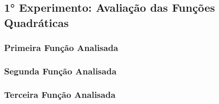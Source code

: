 
\tbltempo
{}\tbliter
{}\tblEFobj
{}\tblESOL


\subsection{1° Experimento: Avaliação das Funções Quadráticas}
    \subsubsection{Primeira Função Analisada}
    \subsubsection{Segunda Função Analisada}
    \subsubsection{Terceira Função Analisada}